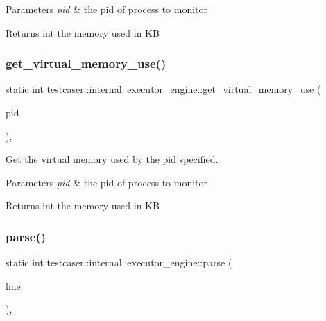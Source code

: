 \begin{DoxyParams}{Parameters}
{\em pid} & the pid of process to monitor \\
\hline
\end{DoxyParams}
\begin{DoxyReturn}{Returns}
int the memory used in KB 
\end{DoxyReturn}
\mbox{\label{structtestcaser_1_1internal_1_1executor__engine_ab70c6b9356bc0dbaf138aa017b048e8a}} 
\subsubsection{\texorpdfstring{get\_virtual\_memory\_use()}{get\_virtual\_memory\_use()}}
{\footnotesize\ttfamily static int testcaser\+::internal\+::executor\+\_\+engine\+::get\+\_\+virtual\+\_\+memory\+\_\+use (\begin{DoxyParamCaption}\item[{pid\+\_\+t}]{pid }\end{DoxyParamCaption})\hspace{0.3cm}{\ttfamily [inline]}, {\ttfamily [static]}}



Get the virtual memory used by the pid specified. 


\begin{DoxyParams}{Parameters}
{\em pid} & the pid of process to monitor \\
\hline
\end{DoxyParams}
\begin{DoxyReturn}{Returns}
int the memory used in KB 
\end{DoxyReturn}
\mbox{\label{structtestcaser_1_1internal_1_1executor__engine_a80ed3584cab00a573de09502df329919}} 
\subsubsection{\texorpdfstring{parse()}{parse()}}
{\footnotesize\ttfamily static int testcaser\+::internal\+::executor\+\_\+engine\+::parse (\begin{DoxyParamCaption}\item[{char $\ast$}]{line }\end{DoxyParamCaption})\hspace{0.3cm}{\ttfamily [inline]}, {\ttfamily [static]}}



